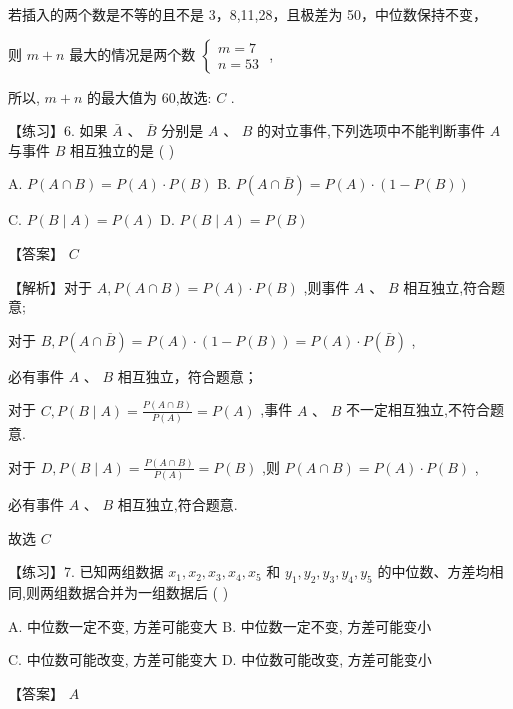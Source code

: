 \documentclass[10pt]{article}
\newcommand*\circled[1]{\tikz[baseline=(char.base)]{\node[shape=circle,draw,inner sep=1.5pt] (char) {\small #1};}}
\begin{document}
 \circled{3} 若插入的两个数是不等的且不是 3，8,11,28，且极差为 50，中位数保持不变，

则 \(m + n\) 最大的情况是两个数 \(\left\{  \begin{array}{l} m = 7 \\  n = {53} \end{array}\right.\) ,

所以, \(m + n\) 的最大值为 60,故选: \(C\) .

【练习】6. 如果 \(\bar{A}\text{ 、 }\bar{B}\) 分别是 \(A\text{ 、 }B\) 的对立事件,下列选项中不能判断事件 \(A\) 与事件 \(B\) 相互独立的是 ( )

A. \(P\left( {A \cap  B}\right)  = P\left( A\right)  \cdot  P\left( B\right)\) B. \(P\left( {A \cap  \bar{B}}\right)  = P\left( A\right)  \cdot  \left( {1 - P\left( B\right) }\right)\)

C. \(P\left( {B \mid  A}\right)  = P\left( A\right)\) D. \(P\left( {B \mid  A}\right)  = P\left( B\right)\)

【答案】 \(C\)

【解析】对于 \(A,P\left( {A \cap  B}\right)  = P\left( A\right)  \cdot  P\left( B\right)\) ,则事件 \(A\text{ 、 }B\) 相互独立,符合题意;

对于 \(B,P\left( {A \cap  \bar{B}}\right)  = P\left( A\right)  \cdot  \left( {1 - P\left( B\right) }\right)  = P\left( A\right)  \cdot  P\left( \bar{B}\right)\) ,

必有事件 \(A\text{ 、 }B\) 相互独立，符合题意；

对于 \(C,P\left( {B \mid  A}\right)  = \frac{P\left( {A \cap  B}\right) }{P\left( A\right) } = P\left( A\right)\) ,事件 \(A\text{ 、 }B\) 不一定相互独立,不符合题意.

对于 \(D,P\left( {B \mid  A}\right)  = \frac{P\left( {A \cap  B}\right) }{P\left( A\right) } = P\left( B\right)\) ,则 \(P\left( {A \cap  B}\right)  = P\left( A\right)  \cdot  P\left( B\right)\) ,

必有事件 \(A\text{ 、 }B\) 相互独立,符合题意.

故选 \(C\)

【练习】7. 已知两组数据 \({x}_{1},{x}_{2},{x}_{3},{x}_{4},{x}_{5}\) 和 \({y}_{1},{y}_{2},{y}_{3},{y}_{4},{y}_{5}\) 的中位数、方差均相同,则两组数据合并为一组数据后 ( )

A. 中位数一定不变, 方差可能变大 B. 中位数一定不变, 方差可能变小

C. 中位数可能改变, 方差可能变大 D. 中位数可能改变, 方差可能变小

【答案】 \(A\)
\end{document}
